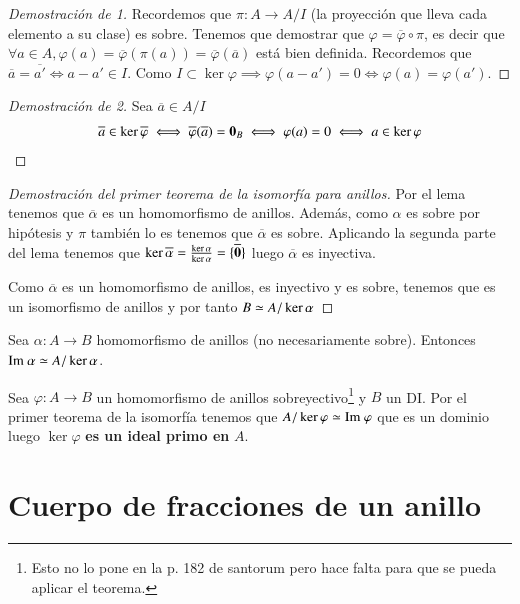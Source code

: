 \begin{proof}[Demostración de 1]
	Recordemos que $\pi:A \to A/I$ (la proyección que lleva cada elemento a su clase) es sobre. Tenemos que demostrar que $\varphi = \overline{\varphi} \circ \pi$, es decir que $\forall a \in A, \varphi(a) = \overline{\varphi}(\pi(a))= \overline{\varphi}(\overline{a})$ está bien definida. Recordemos que $\overline{a} = \overline{a'} \iff a - a' \in I$. Como $I \subset \ker \varphi \implies \varphi(a - a') = 0 \iff \varphi(a) = \varphi(a')$.
\end{proof}

\begin{proof}[Demostración de 2]
	Sea $\overline{a} \in A/I$
	\begin{align*}
		\overline{a} \in \ker \overline{\varphi} \iff \overline{\varphi}(\overline{a}) = \mathbf{0}_B \iff \varphi(a) = 0 \iff a \in \ker \varphi
	\end{align*}
\end{proof}

\begin{proof}[Demostración del primer teorema de la isomorfía para anillos]
	Por el lema tenemos que $\overline{\alpha}$ es un homomorfismo de anillos. Además, como $\alpha$ es sobre por hipótesis y $\pi$ también lo es tenemos que $\overline{\alpha}$ es sobre. Aplicando la segunda parte del lema tenemos que $\ker \overline{\alpha} = \frac{\ker \alpha}{\ker \alpha} = \{\overline{\mathbf{0}}\}$ luego $\overline{\alpha}$ es inyectiva.
	
	Como $\overline{\alpha}$ es un homomorfismo de anillos, es inyectivo y es sobre, tenemos que es un isomorfismo de anillos y por tanto $B \simeq A / \ker \alpha$
\end{proof}

\begin{cor}
	Sea $\alpha: A \to B$ homomorfismo de anillos (no necesariamente sobre). Entonces $\text{Im } \alpha \simeq A / \ker \alpha$.
\end{cor}

\begin{obs}
	Sea $\varphi:A \to B$ un homomorfismo de anillos sobreyectivo\footnote{Esto no lo pone en la p. 182 de santorum pero hace falta para que se pueda aplicar el teorema.} y $B$ un DI. Por el primer teorema de la isomorfía tenemos que $A / \ker \varphi \simeq \text{Im } \varphi$ que es un dominio luego $\ker \varphi$ \textbf{es un ideal primo en} $A$.
\end{obs}


\section{Cuerpo de fracciones de un anillo}

